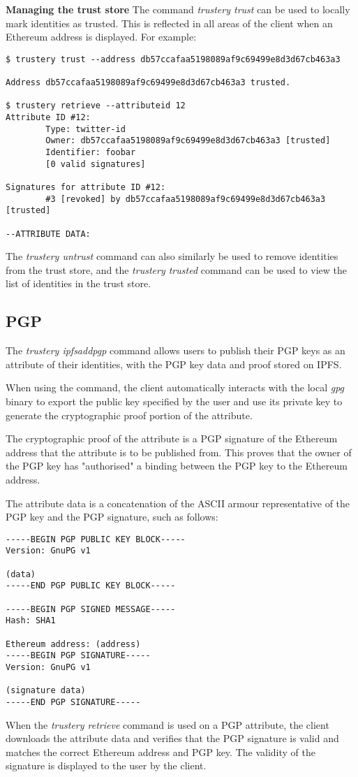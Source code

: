 \documentclass[12pt]{report}
\begin{document}
	\bigskip
	\noindent \textbf{Managing the trust store}\newline
	The command \textit{trustery trust} can be used to locally mark identities as trusted. This is reflected in all areas of the client when an Ethereum address is displayed. For example:
	\begin{lstlisting}
$ trustery trust --address db57ccafaa5198089af9c69499e8d3d67cb463a3

Address db57ccafaa5198089af9c69499e8d3d67cb463a3 trusted.

$ trustery retrieve --attributeid 12
Attribute ID #12:
        Type: twitter-id
        Owner: db57ccafaa5198089af9c69499e8d3d67cb463a3 [trusted]
        Identifier: foobar
        [0 valid signatures]

Signatures for attribute ID #12:
        #3 [revoked] by db57ccafaa5198089af9c69499e8d3d67cb463a3 [trusted]

--ATTRIBUTE DATA:

	\end{lstlisting}
	The \textit{trustery untrust} command can also similarly be used to remove identities from the trust store, and the \textit{trustery trusted} command can be used to view the list of identities in the trust store.
	
	\subsection{PGP}
	The \textit{trustery ipfsaddpgp} command allows users to publish their PGP keys as an attribute of their identities, with the PGP key data and proof stored on IPFS.
	
	When using the command, the client automatically interacts with the local \textit{gpg} binary to export the public key specified by the user and use its private key to generate the cryptographic proof portion of the attribute.
	
	The cryptographic proof of the attribute is a PGP signature of the Ethereum address that the attribute is to be published from. This proves that the owner of the PGP key has "authorised" a binding between the PGP key to the Ethereum address.
	
	The attribute data is a concatenation of the ASCII armour representative of the PGP key and the PGP signature, such as follows:
	\begin{lstlisting}
-----BEGIN PGP PUBLIC KEY BLOCK-----
Version: GnuPG v1

(data)
-----END PGP PUBLIC KEY BLOCK-----

-----BEGIN PGP SIGNED MESSAGE-----
Hash: SHA1

Ethereum address: (address)
-----BEGIN PGP SIGNATURE-----
Version: GnuPG v1

(signature data)
-----END PGP SIGNATURE-----
	\end{lstlisting}
	When the \textit{trustery retrieve} command is used on a PGP attribute, the client downloads the attribute data and verifies that the PGP signature is valid and matches the correct Ethereum address and PGP key. The validity of the signature is displayed to the user by the client.
	
\end{document}
